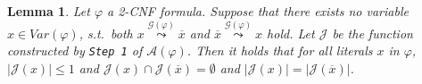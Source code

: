 \documentclass [11pt]{article}
\newcommand{\True}{\mathbf{true}}
\def\ox{\overline{x}}
\newcommand{\var}{\mathit{Var}}
\newtheorem{lemma}[theorem]{Lemma}
\newcommand{\reach}{\leadsto}
\newcommand{\sreach}[1]{\stackrel{#1}{\leadsto}}
\begin{document}


\begin{lemma}
\label{lem:1-alt-step1}
Let $\varphi$ a 2-CNF formula. Suppose that there exists no variable $x \in \var(\varphi)$, s.t.\ both $x \sreach{\mathcal{G}(\varphi)} \ox$ and $\ox \sreach{\mathcal{G}(\varphi)}  x$ hold.
Let  $\mathcal{J}$ be the function constructed by \texttt{Step 1} of $\mathcal{A}(\varphi)$. Then it holds that for all literals $x$ in $\varphi$, $|\mathcal{J}(x)|\leq 1$ and $\mathcal{J}(x) \cap \mathcal{J}(\overline{x}) = \emptyset$ and $|\mathcal{J}(x)| = |\mathcal{J}(\overline{x})|$.
\end{lemma}
\end{document}
